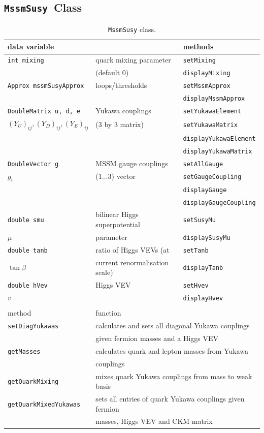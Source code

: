 \documentclass{article}
\def\code#1{\small{\tt #1}\normalsize}
\begin{document}
\subsection{\code{MssmSusy}~Class \label{sec:mssmsusy}}
%
\begin{table}\begin{center}\begin{tabular}{lll} 
data variable & & methods \\ \hline
\code{int mixing} & quark mixing parameter & \code{setMixing} \\
 & (default 0) & \code{displayMixing} \\ \hline
\code{Approx mssmSusyApprox} & loops/thresholds & \code{setMssmApprox} \\
 & & \code{displayMssmApprox} \\ \hline
\code{DoubleMatrix u, d, e}  & Yukawa
couplings & \code{setYukawaElement} \\ 
$(Y_U)_{ij}, (Y_D)_{ij}, (Y_E)_{ij}$&(3 by 3 matrix) &
\code{setYukawaMatrix} \\
 & & \code{displayYukawaElement}\\
 & & \code{displayYukawaMatrix}\\ \hline
\code{DoubleVector g} & MSSM gauge couplings & \code{setAllGauge} \\
$g_i$ & ($1 \ldots 3$) vector & \code{setGaugeCoupling} \\ 
 & & \code{displayGauge} \\
 & & \code{displayGaugeCoupling} \\ \hline
\code{double smu} & bilinear Higgs superpotential & \code{setSusyMu}\\
$\mu$ & parameter & \code{displaySusyMu}\\ \hline
\code{double tanb} & ratio of Higgs VEVs (at  & \code{setTanb}\\
  $\tan \beta$  &  current renormalisation scale)& \code{displayTanb} \\ \hline
\code{double hVev} & Higgs VEV & \code{setHvev} \\
$v$ & & \code{displayHvev} \\
 & & \\
method & \multicolumn{2}{l}{function} \\ \hline 
\code{setDiagYukawas} & \multicolumn{2}{l}{calculates and sets all diagonal
Yukawa couplings }\\
& \multicolumn{2}{l}{given fermion masses and a Higgs VEV} \\
\code{getMasses} & \multicolumn{2}{l}{calculates quark and lepton masses from
Yukawa} \\
 &  \multicolumn{2}{l}{couplings}\\
\code{getQuarkMixing} & \multicolumn{2}{l}{mixes quark Yukawa couplings from mass to weak basis}\\
\code{getQuarkMixedYukawas} & \multicolumn{2}{l}{sets all entries of quark Yukawa couplings given
fermion} \\
 & \multicolumn{2}{l}{masses, Higgs VEV and CKM matrix }\\
\end{tabular}
\caption{\label{tab:mssmsusy}\code{MssmSusy} class. }\end{center}\end{table}
\end{document}
